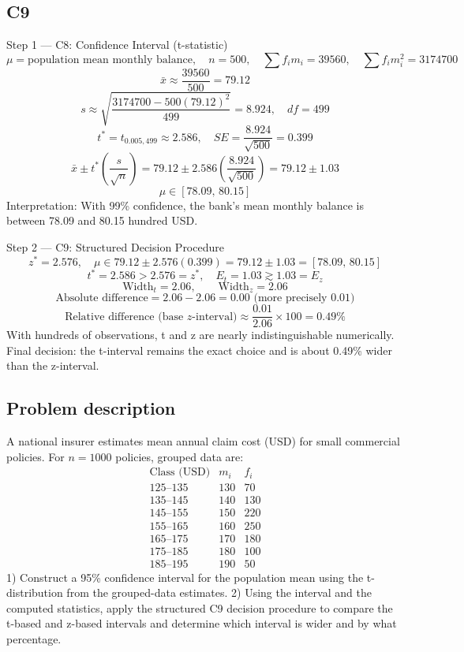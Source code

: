 \begin{ExamProblems}
		\subsection*{C9}
		Step 1 --- C8: Confidence Interval (t-statistic)
		\[
		\mu=\text{population mean monthly balance},\quad n=500,\quad \sum f_im_i=39560,\quad \sum f_im_i^2=3174700
		\]
		\[
		\bar{x}\approx\frac{39560}{500}=79.12
		\]
		\[
		s\approx\sqrt{\frac{3174700-500(79.12)^2}{499}}=8.924,\quad df=499
		\]
		\[
		t^*=t_{0.005,499}\approx 2.586,\quad SE=\frac{8.924}{\sqrt{500}}=0.399
		\]
		\[
		\bar{x}\pm t^*\left(\frac{s}{\sqrt{n}}\right)=79.12\pm 2.586\left(\frac{8.924}{\sqrt{500}}\right)=79.12\pm 1.03
		\]
		\[
		\mu\in[78.09,\,80.15]
		\]
		Interpretation: With 99\% confidence, the bank's mean monthly balance is between 78.09 and 80.15 hundred USD.

		Step 2 --- C9: Structured Decision Procedure
		\[
		z^*=2.576,\quad \mu\in 79.12\pm 2.576(0.399)=79.12\pm 1.03=[78.09,\,80.15]
		\]
		\[
		t^*=2.586>2.576=z^*,\quad E_t=1.03\gtrsim 1.03=E_z
		\]
		\[
		\text{Width}_t=2.06,\qquad \text{Width}_z=2.06
		\]
		\[
		\text{Absolute difference}=2.06-2.06=0.00\text{ (more precisely }0.01\text{)}
		\]
		\[
		\text{Relative difference (base }z\text{-interval)}\approx\frac{0.01}{2.06}\times 100=0.49\%
		\]
		With hundreds of observations, t and z are nearly indistinguishable numerically.
		Final decision: the t-interval remains the exact choice and is about 0.49\% wider than the z-interval.

		\newpage
		\item
		\subsection*{Problem description}
		A national insurer estimates mean annual claim cost (USD) for small commercial policies.
		For $n=1000$ policies, grouped data are:
		\[
		\begin{array}{c|c|c}
		\text{Class (USD)} & m_i & f_i\\\hline
		125\text{--}135 & 130 & 70\\
		135\text{--}145 & 140 & 130\\
		145\text{--}155 & 150 & 220\\
		155\text{--}165 & 160 & 250\\
		165\text{--}175 & 170 & 180\\
		175\text{--}185 & 180 & 100\\
		185\text{--}195 & 190 & 50
		\end{array}
		\]
		1) Construct a 95\% confidence interval for the population mean using the t-distribution from the grouped-data estimates.
		2) Using the interval and the computed statistics, apply the structured C9 decision procedure to compare the t-based and z-based intervals and determine which interval is wider and by what percentage.


\end{ExamProblems}
